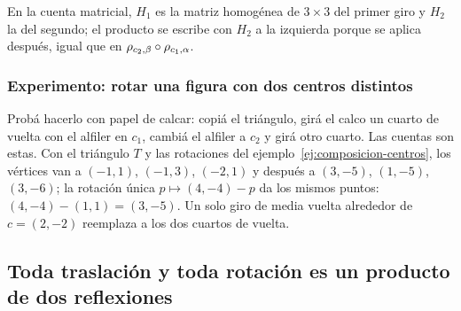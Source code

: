 En la cuenta matricial, \(H_1\) es la matriz homogénea de \(3\times3\) del primer giro y
\(H_2\) la del segundo; el producto se escribe con \(H_2\) a la izquierda porque se aplica
después, igual que en \(\rho_{c_2,\beta}\circ\rho_{c_1,\alpha}\).

\subsubsection{Experimento: rotar una figura con dos centros distintos}

Probá hacerlo con papel de calcar: copiá el triángulo, girá el calco un cuarto de vuelta con
el alfiler en \(c_1\), cambiá el alfiler a \(c_2\) y girá otro cuarto. Las cuentas son estas.
Con el triángulo \(T\) y las rotaciones del ejemplo~\ref{ej:composicion-centros}, los vértices
van a \((-1,1)\), \((-1,3)\), \((-2,1)\) y después a \((3,-5)\), \((1,-5)\), \((3,-6)\); la
rotación única \(p\mapsto(4,-4)-p\) da los mismos puntos: \((4,-4)-(1,1)=(3,-5)\).
Un solo giro de media vuelta alrededor de \(c=(2,-2)\) reemplaza a los dos cuartos de vuelta.

\begin{center}
\end{center}

\subsection{Toda traslación y toda rotación es un producto de dos reflexiones}\label{sec:t3-t4}

